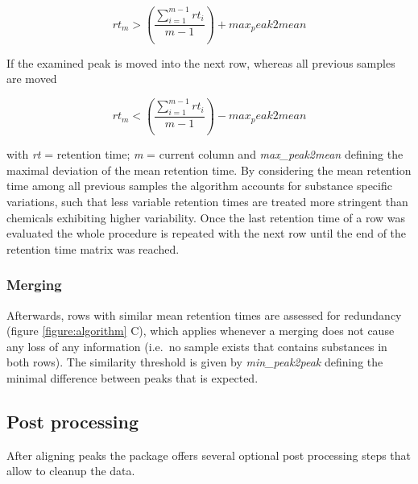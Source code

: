 \begin{equation}
rt_{m} > \left(\frac{\sum_{i=1}^{m-1}rt_{i}}{m-1}\right) + max_peak2mean
\end{equation}

If the examined peak is moved into the next row, whereas all previous
samples are moved \par

\begin{equation}
rt_{m} < \left(\frac{\sum_{i=1}^{m-1}rt_{i}}{m-1}\right) - max_peak2mean
\end{equation}

with \textit{rt} = retention time; \textit{m} = current column and
\textit{max_peak2mean} defining the maximal deviation of the mean
retention time. \newline By considering the mean retention time among
all previous samples the algorithm accounts for substance specific
variations, such that less variable retention times are treated more
stringent than chemicals exhibiting higher variability. Once the last
retention time of a row was evaluated the whole procedure is repeated
with the next row until the end of the retention time matrix was
reached. \subsubsection{Merging} Afterwards, rows with similar mean
retention times are assessed for redundancy (figure
\ref{figure:algorithm} C), which applies whenever a merging does not
cause any loss of any information (i.e.~no sample exists that contains
substances in both rows). The similarity threshold is given by
\textit{min_peak2peak} defining the minimal difference between peaks
that is expected. \par 

\subsection{Post processing}

After aligning peaks the package offers several optional post processing
steps that allow to cleanup the data.
